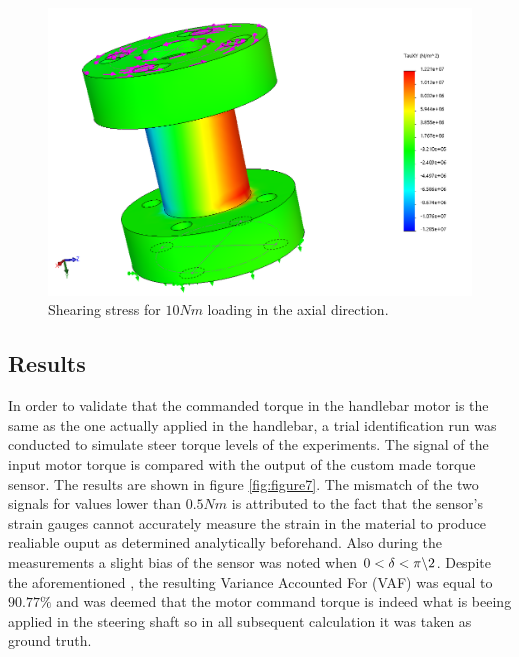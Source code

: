 \begin{figure}[h]
\centering
\captionsetup{justification=centering,margin=2cm}

\includegraphics[scale=0.6]{images/sensor_shear_SW.png}
	\caption[Short title]{Shearing stress for \ensuremath{10 Nm} loading in the axial direction.}
\label{fig:figure6}
\end{figure}

\subsection{Results}
In order to validate that the commanded torque in the handlebar motor is the same as the one actually applied in the handlebar, a trial identification run was conducted to simulate steer torque levels of the experiments. The signal of the input motor torque is compared with the output of the custom made torque sensor. The results are shown in figure \ref{fig:figure7}. The mismatch of the two signals for values lower than \ensuremath{0.5 Nm} is attributed to the fact that the sensor's strain gauges cannot accurately measure the strain in the material to produce realiable ouput as determined analytically beforehand. Also during the measurements a slight bias of the sensor was noted when  \ensuremath{0<\delta<\pi \char`\\
2}. Despite the aforementioned , the resulting Variance Accounted For (VAF) was equal to \ensuremath{90.77 \%} and was deemed that the motor command torque  is indeed what is beeing applied in the steering shaft so in all subsequent calculation it was taken as ground truth.

